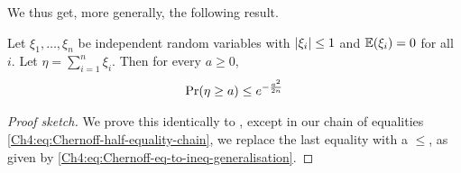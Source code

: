 We thus get, more generally, the following result.

\begin{boxtheorem}\label{Ch4:Thm:Chernoff}
    Let $\xi_1, \ldots, \xi_n$ be independent random variables with $\left\lvert \xi_i \right\rvert \leq 1$ and $\mathbb{E}\!\left( \xi_i \right) = 0$ for all $i$. Let $\eta = \sum_{i=1}^{n} \xi_i$. Then for every $a \geq 0$,
    \begin{align*}
        \Pr\!\left( \eta \geq a \right) \leq e^{-\frac{a^2}{2n}}
    \end{align*}
\end{boxtheorem}
\begin{proof}[Proof sketch]
    We prove this identically to , except in our chain of equalities \eqref{Ch4:eq:Chernoff-half-equality-chain}, we  replace the last equality with a $\le$, as given by \eqref{Ch4:eq:Chernoff-eq-to-ineq-generalisation}.
\end{proof}